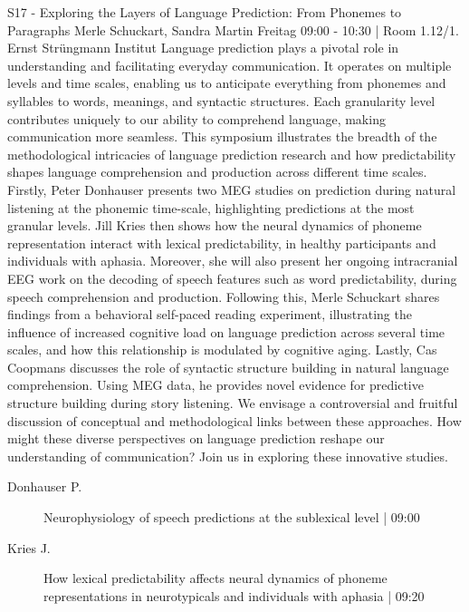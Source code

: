 
            \begin{symposium}
            {S17 - Exploring the Layers of Language Prediction: From Phonemes to Paragraphs}
            {Merle Schuckart, Sandra Martin}
            {Freitag 09:00 - 10:30 | Room 1.12/1.}
            { Ernst Strüngmann Institut}
            Language prediction plays a pivotal role in understanding and facilitating everyday communication. It operates on multiple levels and time scales, enabling us to anticipate everything from phonemes and syllables to words, meanings, and syntactic structures. Each granularity level contributes uniquely to our ability to comprehend language, making communication more seamless. This symposium illustrates the breadth of the methodological intricacies of language prediction research and how predictability shapes language comprehension and production across different time scales.
Firstly, Peter Donhauser presents two MEG studies on prediction during natural listening at the phonemic time-scale, highlighting predictions at the most granular levels. Jill Kries then shows how the neural dynamics of phoneme representation interact with lexical predictability, in healthy participants and individuals with aphasia. Moreover, she will also present her ongoing intracranial EEG work on the decoding of speech features such as word predictability, during speech comprehension and production. Following this, Merle Schuckart shares findings from a behavioral self-paced reading experiment, illustrating the influence of increased cognitive load on language prediction across several time scales, and how this relationship is modulated by cognitive aging. Lastly, Cas Coopmans discusses the role of syntactic structure building in natural language comprehension. Using MEG data, he provides novel evidence for predictive structure building during story listening.
We envisage a controversial and fruitful discussion of conceptual and methodological links between these approaches. How might these diverse perspectives on language prediction reshape our understanding of communication? Join us in exploring these innovative studies.
            \begin{description}    
            
                \item [ Donhauser P.] Neurophysiology of speech predictions at the sublexical level \textcolor{mygray}{ | 09:00}    
                
                \item [ Kries J.] How lexical predictability affects neural dynamics of phoneme representations in neurotypicals and individuals with aphasia \textcolor{mygray}{ | 09:20}    
                

\end{description}
\end{symposium}
